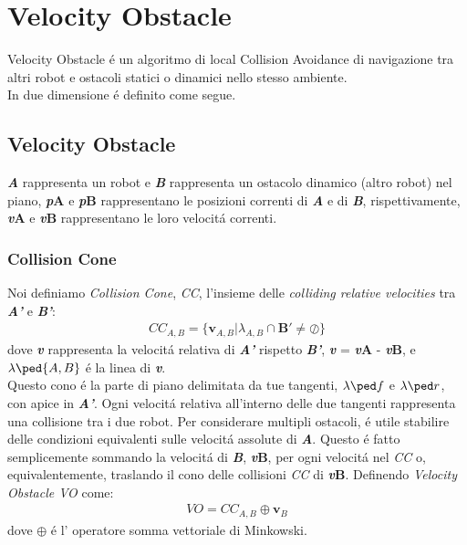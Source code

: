 
\chapter{Velocity Obstacle}
\label{cap:vo}

Velocity Obstacle \'e un algoritmo di local Collision Avoidance di navigazione tra altri robot e ostacoli statici o dinamici nello stesso ambiente.
\\In due dimensione \'e definito come segue.

\section{Velocity Obstacle}

{\bfseries\textit{A}} rappresenta un robot e {\bfseries\textit{B}} rappresenta un ostacolo dinamico (altro robot) nel piano,
{\bfseries\textit{p}\ped A} e {\bfseries\textit{p}\ped B} rappresentano le posizioni correnti di {\bfseries\textit{A}} e di {\bfseries\textit{B}}, rispettivamente,  {\bfseries\textit{v}\ped A} e {\bfseries\textit{v}\ped B} rappresentano le loro velocit\'a correnti.


\subsection{Collision Cone}

Noi definiamo \textit{Collision Cone},  \textit{CC}, l'insieme delle \textit{colliding relative velocities} tra {\bfseries\textit{A'}} e {\bfseries\textit{B'}}:
\begin{gather}
CC_{A,B} = \{ \boldsymbol{v}_{A,B} | \lambda_{A,B} \cap \boldsymbol{B'} \neq \oslash \}
\end{gather}
dove  {\bfseries\textit{v}} rappresenta la velocit\'a relativa di {\bfseries\textit{A'}} rispetto {\bfseries\textit{B'}}, {\bfseries\textit{v}} = {\bfseries\textit{v}\ped A} - {\bfseries\textit{v}\ped B}, e $\lambda\ped {A,B}$  \'e la linea di {\bfseries\textit{v}}.
\\Questo cono \'e la parte di piano delimitata da tue tangenti, $\lambda\ped f$ e $\lambda\ped r$, con apice in {\bfseries\textit{A'}}. Ogni velocit\'a relativa all'interno delle due tangenti rappresenta una collisione tra i due robot. 
Per considerare multipli ostacoli, \'e utile stabilire delle condizioni equivalenti sulle velocit\'a assolute di {\bfseries\textit{A}}. Questo \'e fatto semplicemente sommando la velocit\'a di {\bfseries\textit{B}}, {\bfseries\textit{v}\ped B}, per ogni velocit\'a nel \textit{CC} o, equivalentemente, traslando il cono delle collisioni \textit{CC} di {\bfseries\textit{v}\ped B}. Definendo \textit{Velocity Obstacle VO} come:
\begin{gather}
VO= CC_{A,B} \oplus \boldsymbol{v}_{B} 
\end{gather}
dove $\oplus$ \'e l' operatore somma vettoriale di Minkowski.

